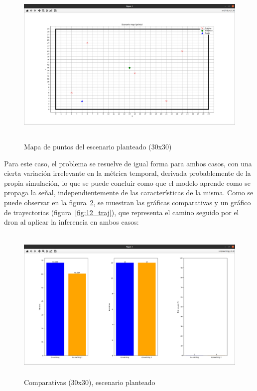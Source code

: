 \begin{figure} [t]
    \begin{center}
    \includegraphics[height=8cm]{imagenes/cap4/25_mapa_p_diff.png}
    \end{center}
    \caption[Mapa de puntos del escenario planteado (30x30)]{Mapa de puntos del escenario planteado (30x30)}
    \label{fig:map_p_diff_30}
\end{figure}

Para este caso, el problema se resuelve de igual forma para ambos casos, con una cierta variación irrelevante en la métrica temporal, derivada probablemente de la propia simulación, lo que se puede concluir como que el modelo aprende como se propaga la señal, independientemente de las características de la misma. Como se puede observar en la figura~\ref{fig:comp_diff_30}, se muestran las gráficas comparativas y un gráfico de trayectorias (figura~\ref{fig:12_traj}), que representa el camino seguido por el dron al aplicar la inferencia en ambos casos:\\

\begin{figure} [t]
    \begin{center}
    \includegraphics[height=7.5cm]{imagenes/cap4/26_comp_diff.png}
    \end{center}
    \caption[Comparativas (30x30), escenario planteado]{Comparativas (30x30), escenario planteado}
    \label{fig:comp_diff_30}
\end{figure}


